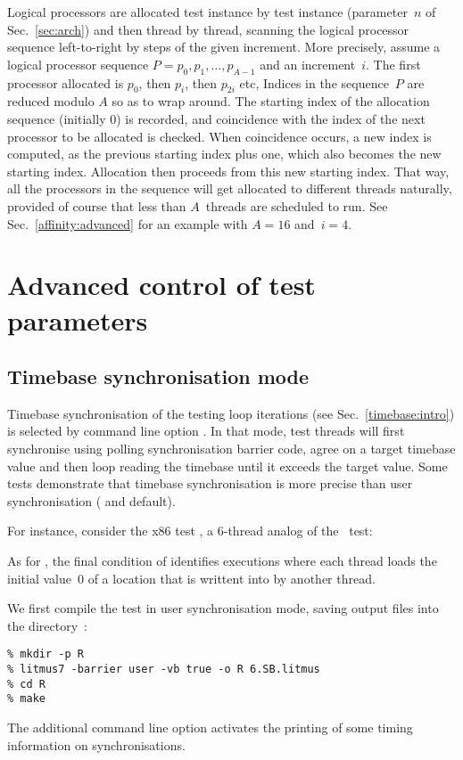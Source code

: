 \label{incr:full}Logical processors are allocated
test instance by test instance
(parameter~$n$ of Sec.~\ref{sec:arch}) and then
thread by thread, scanning the logical processor sequence
left-to-right by steps of the given increment.
More precisely, assume a logical processor sequence
$P = p_0, p_1, \ldots, p_{A-1}$ and an increment~$i$.
The first processor allocated is $p_0$, then $p_i$, then $p_{2i}$ etc,
Indices in the sequence~$P$ are reduced modulo $A$ so as to wrap around.
The starting index of the allocation sequence (initially $0$) is recorded,
and coincidence with the index of the next processor to be 
allocated is checked.
When coincidence occurs, a new index is computed, as the previous
starting index plus one, which also becomes the new starting index.
Allocation then proceeds from this new starting index.
That way, all the processors in the sequence
will get allocated to different threads naturally, provided of
course that less than $A$~threads are scheduled to run.
See Sec.~\ref{affinity:advanced} for an example with $A=16$ and~$i=4$.

\section{Advanced\label{advanced:control} control of test parameters}

\subsection{Timebase \label{timebase}synchronisation mode}
Timebase synchronisation of the testing loop iterations
(see Sec.~\ref{timebase:intro}) is selected by \litmus{} command line option
.
In that mode,
test threads will first synchronise using polling synchronisation
barrier code, agree on a target timebase value and then loop
reading the timebase until it exceeds the target value.
Some tests demonstrate that timebase synchronisation
is more precise than user synchronisation ( and default).

For instance, consider the x86 test ,
a 6-thread analog of the ~test:

As for , the final condition of
 identifies executions where each thread loads the initial
value~$0$ of a location that is writtent into by another thread.
\begin{center}\end{center}

We first compile the test in user synchronisation mode, saving
\litmus{} output files into the directory~:
\begin{verbatim}
% mkdir -p R
% litmus7 -barrier user -vb true -o R 6.SB.litmus
% cd R
% make
\end{verbatim}
The additional command line option  activates the printing
of some timing information on synchronisations.

